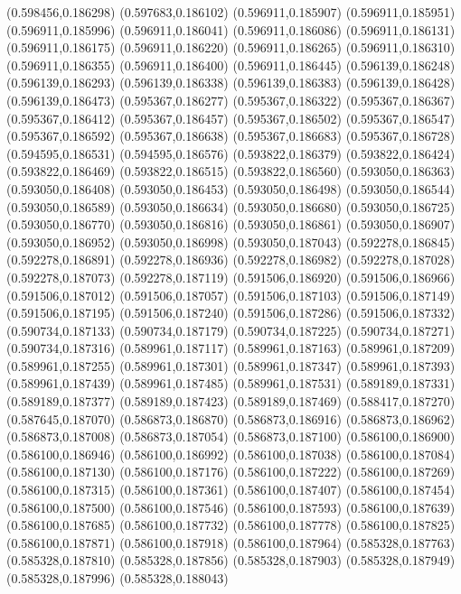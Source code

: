 (0.598456,0.186298)
(0.597683,0.186102)
(0.596911,0.185907)
(0.596911,0.185951)
(0.596911,0.185996)
(0.596911,0.186041)
(0.596911,0.186086)
(0.596911,0.186131)
(0.596911,0.186175)
(0.596911,0.186220)
(0.596911,0.186265)
(0.596911,0.186310)
(0.596911,0.186355)
(0.596911,0.186400)
(0.596911,0.186445)
(0.596139,0.186248)
(0.596139,0.186293)
(0.596139,0.186338)
(0.596139,0.186383)
(0.596139,0.186428)
(0.596139,0.186473)
(0.595367,0.186277)
(0.595367,0.186322)
(0.595367,0.186367)
(0.595367,0.186412)
(0.595367,0.186457)
(0.595367,0.186502)
(0.595367,0.186547)
(0.595367,0.186592)
(0.595367,0.186638)
(0.595367,0.186683)
(0.595367,0.186728)
(0.594595,0.186531)
(0.594595,0.186576)
(0.593822,0.186379)
(0.593822,0.186424)
(0.593822,0.186469)
(0.593822,0.186515)
(0.593822,0.186560)
(0.593050,0.186363)
(0.593050,0.186408)
(0.593050,0.186453)
(0.593050,0.186498)
(0.593050,0.186544)
(0.593050,0.186589)
(0.593050,0.186634)
(0.593050,0.186680)
(0.593050,0.186725)
(0.593050,0.186770)
(0.593050,0.186816)
(0.593050,0.186861)
(0.593050,0.186907)
(0.593050,0.186952)
(0.593050,0.186998)
(0.593050,0.187043)
(0.592278,0.186845)
(0.592278,0.186891)
(0.592278,0.186936)
(0.592278,0.186982)
(0.592278,0.187028)
(0.592278,0.187073)
(0.592278,0.187119)
(0.591506,0.186920)
(0.591506,0.186966)
(0.591506,0.187012)
(0.591506,0.187057)
(0.591506,0.187103)
(0.591506,0.187149)
(0.591506,0.187195)
(0.591506,0.187240)
(0.591506,0.187286)
(0.591506,0.187332)
(0.590734,0.187133)
(0.590734,0.187179)
(0.590734,0.187225)
(0.590734,0.187271)
(0.590734,0.187316)
(0.589961,0.187117)
(0.589961,0.187163)
(0.589961,0.187209)
(0.589961,0.187255)
(0.589961,0.187301)
(0.589961,0.187347)
(0.589961,0.187393)
(0.589961,0.187439)
(0.589961,0.187485)
(0.589961,0.187531)
(0.589189,0.187331)
(0.589189,0.187377)
(0.589189,0.187423)
(0.589189,0.187469)
(0.588417,0.187270)
(0.587645,0.187070)
(0.586873,0.186870)
(0.586873,0.186916)
(0.586873,0.186962)
(0.586873,0.187008)
(0.586873,0.187054)
(0.586873,0.187100)
(0.586100,0.186900)
(0.586100,0.186946)
(0.586100,0.186992)
(0.586100,0.187038)
(0.586100,0.187084)
(0.586100,0.187130)
(0.586100,0.187176)
(0.586100,0.187222)
(0.586100,0.187269)
(0.586100,0.187315)
(0.586100,0.187361)
(0.586100,0.187407)
(0.586100,0.187454)
(0.586100,0.187500)
(0.586100,0.187546)
(0.586100,0.187593)
(0.586100,0.187639)
(0.586100,0.187685)
(0.586100,0.187732)
(0.586100,0.187778)
(0.586100,0.187825)
(0.586100,0.187871)
(0.586100,0.187918)
(0.586100,0.187964)
(0.585328,0.187763)
(0.585328,0.187810)
(0.585328,0.187856)
(0.585328,0.187903)
(0.585328,0.187949)
(0.585328,0.187996)
(0.585328,0.188043)
